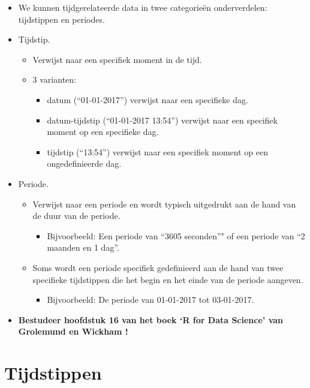 \documentclass[]{memoir}
\providecommand{\tightlist}{%
  \setlength{\itemsep}{0pt}\setlength{\parskip}{0pt}}
\begin{document}
\begin{itemize}
\tightlist
\item
  We kunnen tijdgerelateerde data in twee categorieën onderverdelen: tijdstippen en periodes.
\item
  Tijdstip.

  \begin{itemize}
  \tightlist
  \item
    Verwijst naar een specifiek moment in de tijd.
  \item
    3 varianten:

    \begin{itemize}
    \tightlist
    \item
      datum (``01-01-2017'') verwijst naar een specifieke dag.
    \item
      datum-tijdstip (``01-01-2017 13:54'') verwijst naar een specifiek moment op een specifieke dag.
    \item
      tijdstip (``13:54'') verwijst naar een specifiek moment op een ongedefinieerde dag.
    \end{itemize}
  \end{itemize}
\item
  Periode.

  \begin{itemize}
  \tightlist
  \item
    Verwijst naar een periode en wordt typisch uitgedrukt aan de hand van de duur van de periode.

    \begin{itemize}
    \tightlist
    \item
      Bijvoorbeeld: Een periode van ``3605 seconden''" of een periode van ``2 maanden en 1 dag''.
    \end{itemize}
  \item
    Soms wordt een periode specifiek gedefinieerd aan de hand van twee specifieke tijdstippen die het begin en het einde van de periode aangeven.

    \begin{itemize}
    \tightlist
    \item
      Bijvoorbeeld: De periode van 01-01-2017 tot 03-01-2017.
    \end{itemize}
  \end{itemize}
\item
  \textbf{Bestudeer hoofdstuk 16 van het boek `R for Data Science' van Grolemund en Wickham !}
\end{itemize}

\hypertarget{tijdstippen}{%
\section{Tijdstippen}\label{tijdstippen}}
\end{document}

